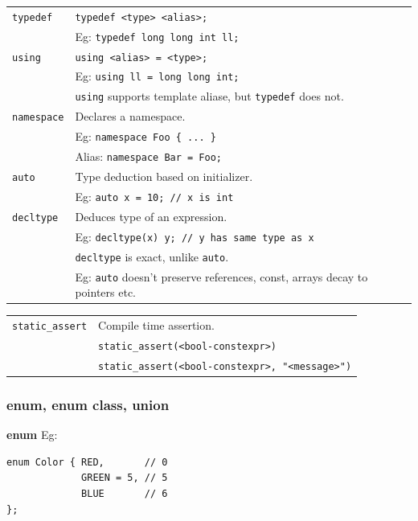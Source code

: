 \begin{tabularx}{\linewidth}{lX}
    \texttt{typedef}        & \texttt{typedef <type> <alias>;}\\
                            & Eg: \texttt{typedef long long int ll;}\\
    \texttt{using}          & \texttt{using <alias> = <type>;}\\
                            & Eg: \texttt{using ll = long long int;}\\
                            & \texttt{using} supports template aliase, but \texttt{typedef} does not.\\
    \texttt{namespace}      & Declares a namespace.\\
                            & Eg: \texttt{namespace Foo \{ ... \}}\\
                            & Alias: \texttt{namespace Bar = Foo;}\\
    \hline
    \texttt{auto}          & Type deduction based on initializer.\\
                           & Eg: \texttt{auto x = 10; // x is int}\\
    \texttt{decltype}      & Deduces type of an expression.\\
                           & Eg: \texttt{decltype(x) y; // y has same type as x}\\
                           & \texttt{decltype} is exact, unlike \texttt{auto}.\\
                           & Eg: \texttt{auto} doesn't preserve references, const, arrays decay to pointers etc.\\
    \hline
\end{tabularx}

\begin{tabularx}{\linewidth}{lX}
    \texttt{static\_assert} & Compile time assertion.\\
                            & \texttt{static\_assert(<bool-constexpr>)}\\
                            & \texttt{static\_assert(<bool-constexpr>, "<message>")}\\
    \hline
\end{tabularx}

\subsubsection{enum, enum class, union}

\textbf{enum}
Eg:
\begin{mdframed}[nobreak=true,backgroundcolor=gray!10,linecolor=Firebrick4]
\begin{verbatim}
enum Color { RED,       // 0
             GREEN = 5, // 5
             BLUE       // 6
};
\end{verbatim}
\end{mdframed}

